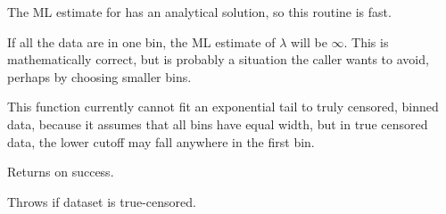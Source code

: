 \begin{sreapi}
The ML estimate for  has an analytical 
solution, so this routine is fast. 

If all the data are in one bin, the ML estimate of
$\lambda$ will be $\infty$. This is mathematically correct,
but is probably a situation the caller wants to avoid, perhaps
by choosing smaller bins.

This function currently cannot fit an exponential tail
to truly censored, binned data, because it assumes that
all bins have equal width, but in true censored data, the
lower cutoff  may fall anywhere in the first bin.

Returns  on success.

Throws  if dataset is true-censored.


\end{sreapi}

